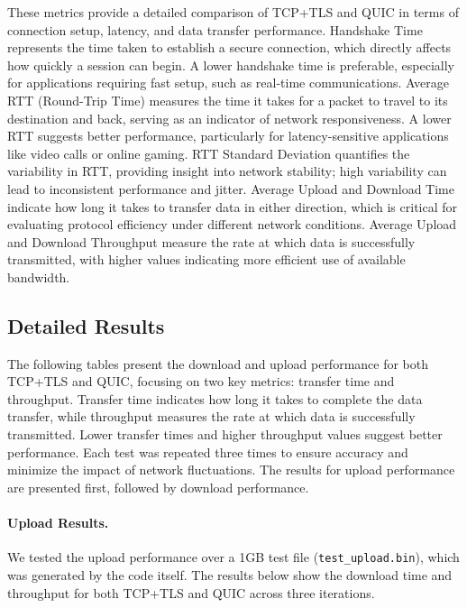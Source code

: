 These metrics provide a detailed comparison of TCP+TLS and QUIC in terms of connection setup, latency, and data transfer performance. Handshake Time represents the time taken to establish a secure connection, which directly affects how quickly a session can begin. A lower handshake time is preferable, especially for applications requiring fast setup, such as real-time communications. Average RTT (Round-Trip Time) measures the time it takes for a packet to travel to its destination and back, serving as an indicator of network responsiveness. A lower RTT suggests better performance, particularly for latency-sensitive applications like video calls or online gaming. RTT Standard Deviation quantifies the variability in RTT, providing insight into network stability; high variability can lead to inconsistent performance and jitter. Average Upload and Download Time indicate how long it takes to transfer data in either direction, which is critical for evaluating protocol efficiency under different network conditions. Average Upload and Download Throughput measure the rate at which data is successfully transmitted, with higher values indicating more efficient use of available bandwidth.

\subsection{Detailed Results}
The following tables present the download and upload performance for both TCP+TLS and QUIC, focusing on two key metrics: transfer time and throughput. Transfer time indicates how long it takes to complete the data transfer, while throughput measures the rate at which data is successfully transmitted. Lower transfer times and higher throughput values suggest better performance. Each test was repeated three times to ensure accuracy and minimize the impact of network fluctuations. The results for upload performance are presented first, followed by download performance.

\paragraph{Upload Results.} We tested the upload performance over a 1GB test file (\texttt{test\_upload.bin}), which was generated by the code itself. The results below show the download time and throughput for both TCP+TLS and QUIC across three iterations.

